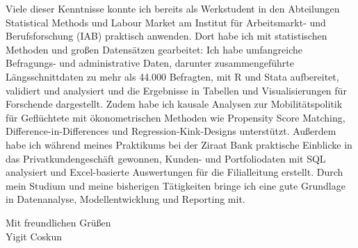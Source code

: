 Viele dieser Kenntnisse konnte ich bereits als Werkstudent in den Abteilungen Statistical Methods und Labour Market am Institut für Arbeitsmarkt- und Berufsforschung (IAB) praktisch anwenden. Dort habe ich mit statistischen Methoden und großen Datensätzen gearbeitet: Ich habe umfangreiche Befragungs- und administrative Daten, darunter zusammengeführte Längsschnittdaten zu mehr als 44.000 Befragten, mit R und Stata aufbereitet, validiert und analysiert und die Ergebnisse in Tabellen und Visualisierungen für Forschende dargestellt. Zudem habe ich kausale Analysen zur Mobilitätspolitik für Geflüchtete mit ökonometrischen Methoden wie Propensity Score Matching, Difference-in-Differences und Regression-Kink-Designs unterstützt. Außerdem habe ich während meines Praktikums bei der Ziraat Bank praktische Einblicke in das Privatkundengeschäft gewonnen, Kunden- und Portfoliodaten mit SQL analysiert und Excel-basierte Auswertungen für die Filialleitung erstellt. Durch mein Studium und meine bisherigen Tätigkeiten bringe ich eine gute Grundlage in Datenanalyse, Modellentwicklung und Reporting mit.


\vspace{12pt}

Mit freundlichen Grüßen \\
Yigit Coskun



